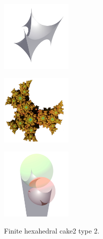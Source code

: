 \documentclass[suppldata, dvipdfmx]{interact}
\theoremstyle{plain}%
\theoremstyle{definition}
\theoremstyle{remark}
\theoremstyle{problemstyle}
\begin{document}
\begin{figure}[H]
 \begin{minipage}{0.5\textwidth}
  \begin{minipage}[t]{0.24\textwidth}
   \centering \includegraphics[width=1.35in, height=1.35in,
   keepaspectratio]{./img/sphairahedron/hexahedralCake2/sphairahedronFinite_b.jpg}
   \label{fig:cake2Type2FiniteSphairahedron}
  \end{minipage}
  \hspace*{\fill}
  \begin{minipage}[t]{0.24\textwidth}
   \centering
   \includegraphics[width=1.35in, height=1.35in,
   keepaspectratio]{./img/sphairahedron/hexahedralCake2/limitsetFinite_b.jpg}
   \label{fig:cake2Type2FiniteLimitset}
  \end{minipage}
  \hspace*{\fill}
  \caption{Finite hexahedral cake2 type 2.}
  \label{fig:cake2Type2finite}
 \end{minipage}
 \hspace*{\fill}
 \begin{minipage}{0.5\textwidth}
  \begin{minipage}[t]{0.24\textwidth}
   \centering
   \includegraphics[width=1.35in, height=1.35in,
   keepaspectratio]{./img/sphairahedron/hexahedralCake2/sphairahedronInf_b.jpg}
   \label{fig:cake2Type2InfSphairahedron}

\end{minipage}
\end{minipage}
\end{figure}
\end{document}
